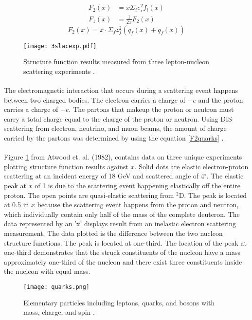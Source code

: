 \begin{align}
		F_2(x) &= x \Sigma_i e^2_i f_i(x) \label{F2pd}\\ 
		F_1(x) &= \frac{1}{2x} F_2(x) \label{CGr} 
\end{align}
\begin{equation}
		F_2(x) = x \cdot \Sigma_f z^2_f ( q_f(x) + \bar{q}_f(x)) \label{F2quarks} 
\end{equation}
\begin{figure}[t]
	\centering
	\texttt{[image: 3slacexp.pdf]} 
	\caption{ Structure function results measured from three  lepton-nucleon scattering experiments \cite{Atwood}.}
	\label{3leps}
\end{figure}
\paragraph{}The electromagnetic interaction that occurs during a scattering event happens between two charged bodies. The electron carries a charge of $- e$ and the proton carries a charge of $+e$. The partons that makeup the proton or neutron must carry a total charge equal to the charge of the proton or neutron. Using DIS scattering from electron, neutrino, and muon beams, the amount of charge carried by the partons was determined by using the equation \ref{F2quarks} \cite{PnN,DISquark,callan}. 

\paragraph{}Figure \ref{3leps} from Atwood et. al. (1982), contains data on three unique experiments plotting structure function results against $x$. Solid dots are elastic electron-proton scattering at an incident energy of 18 GeV and scattered angle of 4$^\circ$. The elastic peak at $x$ of 1 is due to the scattering event happening elastically off the entire proton. The open points are quasi-elastic scattering from $^2$D. The peak is located at 0.5 in $x$ because the scattering event happens from the proton and neutron, which individually contain only half of the mass of the complete deuteron. The data represented by an 'x' displays result from an inelastic electron scattering measurement. The data plotted is the difference between the two nucleon structure functions. The peak is located at one-third. The location of the peak at one-third demonstrates that the struck constituents of the nucleon have a mass approximately one-third of the nucleon and there exist three constituents inside the nucleon with equal mass\cite{Atwood,PnN}.
\begin{figure}[t]
	\centering
	\texttt{[image: quarks.png]} 
	\caption{ Elementary particles including leptons, quarks, and bosons with mass, charge, and spin \cite{sane}.}
	\label{fig:quarks}
\end{figure} 
